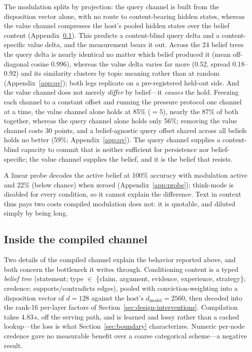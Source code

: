 The modulation splits by projection: the query channel is built from the disposition vector
alone, with no route to content-bearing hidden states, whereas the value channel compresses
the host's pooled hidden states over the belief content (Appendix~\ref{app:compiled-internals}). This
predicts a content-blind query delta and a content-specific value delta, and the measurement
bears it out. Across the 24 belief trees the query delta is nearly identical no matter which
belief produced it (mean off-diagonal cosine 0.996), whereas the value delta varies far more
(0.52, spread 0.18--0.92) and its similarity clusters by topic meaning rather than at random
(Appendix~\ref{app:qv}); both legs replicate on a pre-registered held-out
side. And the value channel does not merely
\emph{differ} by belief---it \emph{causes} the hold. Freezing each channel to a constant offset
and running the pressure protocol one channel at a time, the value channel alone holds at 85\%
(\(=5\)), nearly the 87\% of both together, whereas the query channel alone holds only 56\%;
removing the value channel costs 30 points, and a belief-agnostic query offset shared across all
beliefs holds no better (59\%; Appendix~\ref{app:qv}). The query channel
supplies a content-blind capacity to commit that is neither sufficient for persistence nor
belief-specific; the value channel supplies the belief, and it is the belief that resists.

A linear probe decodes the active belief at 100\% accuracy with modulation active and 22\%
(below chance) when zeroed (Appendix~\ref{app:probe}); think-mode is disabled for every
condition, so it cannot explain the difference. Text in context thus pays two costs compiled
modulation does not: it is quotable, and diluted simply by being long.

\subsection{Inside the compiled channel}
\label{app:compiled-internals}
Two details of the compiled channel explain the behavior reported above, and both concern the
bottleneck it writes through. Conditioning content is a typed \emph{belief tree} (statement;
type $\in$ \{claim, argument, evidence, experience, strategy\}; credence; supports/contradicts
edges), pooled with conviction-weighting into a disposition vector of \(d=128\) against the
host's \(d_{\text{model}}=2560\), then decoded into the rank-16 per-layer factors of
Section~\ref{sec:design-interventions}. Compilation takes 4.83\,s, off the serving path, and is
learned and lossy rather than a cached lookup---the loss is what
Section~\ref{sec:boundary} characterizes. Numeric per-node credence gave no measurable benefit
over a coarse categorical scheme---a negative result.

